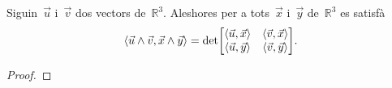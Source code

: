 \documentclass[../../main.tex]{subfiles}
\begin{document}
    \begin{proposition}
        \label{prop:fórmula de Lagrange}
        Siguin~\(\vec{u}\) i~\(\vec{v}\) dos vectors de~\(\mathbb{R}^{3}\).
        Aleshores per a tots~\(\vec{x}\) i~\(\vec{y}\) de~\(\mathbb{R}^{3}\) es satisfà
        \[\prodesc{\vec{u}\prodvec\vec{v}}{\vec{x}\prodvec\vec{y}}=\det\left[\begin{matrix}
            \prodesc{\vec{u}}{\vec{x}} & \prodesc{\vec{v}}{\vec{x}} \\
            \prodesc{\vec{u}}{\vec{y}} & \prodesc{\vec{v}}{\vec{y}}
        \end{matrix}\right].\]
        \begin{proof}
        \end{proof}
    \end{proposition}
\end{document}
